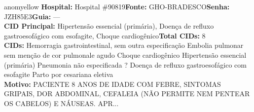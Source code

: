 \documentclass[a4paper,10pt]{article}
\begin{document}
\begin{anomalycard}[Interna\c{c}\~{a}o \#118153 | Pac. \#98039 | MODERADO (z=2.50) | LOS: 4d | 22/02/2026\,$\to$\,26/02/2026]{anomyellow}
\textbf{Hospital:} Hospital \#90819\quad \textbf{Fonte:} GHO-BRADESCO\quad \textbf{Senha:} JZH85E3\quad \textbf{Guia:} ---\\

\textbf{CID Principal:} {\small Hipertensão essencial (primária), Doença de refluxo gastroesofágico com esofagite, Choque cardiogênico}\quad\textbf{Total CIDs:} 8\\

\textbf{CIDs:} {\scriptsize Hemorragia gastrointestinal, sem outra especificação \textbar{} Embolia pulmonar sem menção de cor pulmonale agudo \textbar{} Choque cardiogênico \textbar{} Hipertensão essencial (primária) \textbar{} Pneumonia não especificada \textbar{} ? \textbar{} Doença de refluxo gastroesofágico com esofagite \textbar{} Parto por cesariana eletiva}\\

\textbf{Motivo:} {\scriptsize PACIENTE 8 ANOS DE IDADE COM FEBRE, SINTOMAS GRIPAIS, DOR ABDOMINAL, CEFALEIA (NÃO PERMITE NEM PENTEAR OS CABELOS) E  NÁUSEAS. APR...}\\




\end{anomalycard}
\end{document}
